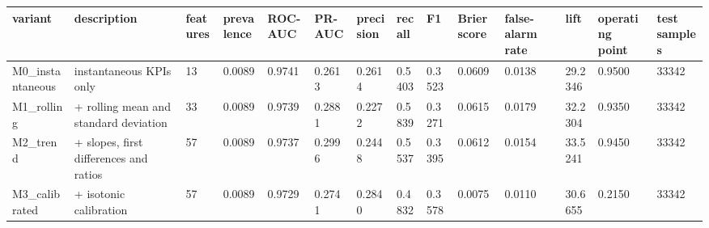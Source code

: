 \begin{tabular}{llllllllllllll}
\toprule
variant & description & features & prevalence & ROC-AUC & PR-AUC & precision & recall & F1 & Brier score & false-alarm rate & lift & operating point & test samples \\
\midrule
M0\_instantaneous & instantaneous KPIs only & 13 & 0.0089 & 0.9741 & 0.2613 & 0.2614 & 0.5403 & 0.3523 & 0.0609 & 0.0138 & 29.2346 & 0.9500 & 33342 \\
M1\_rolling & + rolling mean and standard deviation & 33 & 0.0089 & 0.9739 & 0.2881 & 0.2272 & 0.5839 & 0.3271 & 0.0615 & 0.0179 & 32.2304 & 0.9350 & 33342 \\
M2\_trend & + slopes, first differences and ratios & 57 & 0.0089 & 0.9737 & 0.2996 & 0.2448 & 0.5537 & 0.3395 & 0.0612 & 0.0154 & 33.5241 & 0.9450 & 33342 \\
M3\_calibrated & + isotonic calibration & 57 & 0.0089 & 0.9729 & 0.2741 & 0.2840 & 0.4832 & 0.3578 & 0.0075 & 0.0110 & 30.6655 & 0.2150 & 33342 \\
\bottomrule
\end{tabular}
